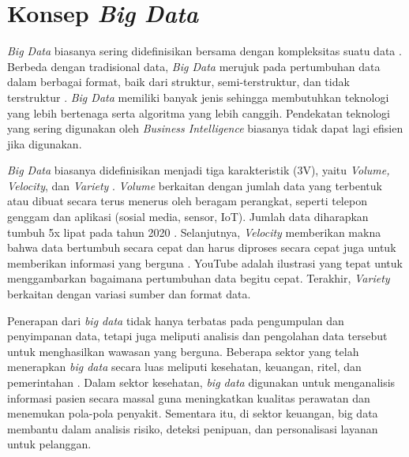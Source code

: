 \section{Konsep \textit{Big Data}}
\textit{Big Data} biasanya sering didefinisikan bersama dengan kompleksitas suatu data \cite{barosenAnalysisComparisonInterfacing2018}. Berbeda dengan tradisional data, \textit{Big Data} merujuk pada pertumbuhan data dalam berbagai format, baik dari struktur, semi-terstruktur, dan tidak terstruktur \cite{oussousBigDataTechnologies2018}. \textit{Big Data} memiliki banyak jenis sehingga membutuhkan teknologi yang lebih bertenaga serta algoritma yang lebih canggih. Pendekatan teknologi yang sering digunakan oleh \textit{Business Intelligence} biasanya tidak dapat lagi efisien jika digunakan.

\textit{Big Data} biasanya didefinisikan menjadi tiga karakteristik (3V), yaitu \textit{Volume, Velocity}, dan \textit{Variety} \cite{furhtIntroductionBigData2016}. \textit{Volume} berkaitan dengan jumlah data yang terbentuk atau dibuat secara terus menerus oleh beragam  perangkat, seperti telepon genggam dan aplikasi (sosial media, sensor, IoT). Jumlah data diharapkan tumbuh 5x lipat pada tahun 2020 \cite{furhtIntroductionBigData2016}. Selanjutnya, \textit{Velocity} memberikan makna bahwa data bertumbuh secara cepat dan harus diproses secara cepat juga untuk memberikan informasi yang berguna \cite{sandhuBigDataCloud2022}. YouTube adalah ilustrasi yang tepat untuk menggambarkan bagaimana pertumbuhan data begitu cepat. Terakhir, \textit{Variety} berkaitan dengan variasi sumber dan format data. 

Penerapan dari \textit{big data} tidak hanya terbatas pada pengumpulan dan penyimpanan data, tetapi juga meliputi analisis dan pengolahan data tersebut untuk menghasilkan wawasan yang berguna. Beberapa sektor yang telah menerapkan \textit{big data} secara luas meliputi kesehatan, keuangan, ritel, dan pemerintahan \cite{oussousBigDataTechnologies2018}. Dalam sektor kesehatan, \textit{big data} digunakan untuk menganalisis informasi pasien secara massal guna meningkatkan kualitas perawatan dan menemukan pola-pola penyakit. Sementara itu, di sektor keuangan, big data membantu dalam analisis risiko, deteksi penipuan, dan personalisasi layanan untuk pelanggan.

